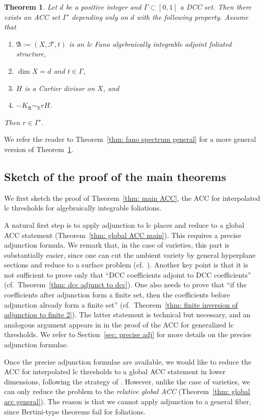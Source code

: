 \documentclass[11pt,reqno]{amsart}
\numberwithin{equation}{section}
\newcommand{\Aa}{{\mathfrak{A}}}
\newcommand{\Ff}{\mathcal{F}}
\newcommand{\Ii}{\Gamma}
\newtheorem{thm}{Theorem}[section]
\theoremstyle{definition}
\begin{document}
\begin{thm}\label{thm: fano spectrum main}
    Let $d$ be a positive integer and $\Ii\subset [0,1]$ a DCC set. Then there exists an ACC set $\Ii'$ depending only on $d$ with the following property. Assume that
\begin{enumerate}
    \item $\Aa:=(X,\Ff,t)$ is an lc Fano algebraically integrable adjoint foliated structure,
    \item $\dim X=d$ and $t\in\Ii$,
    \item $H$ is a Cartier divisor on $X$, and
    \item $-K_{\Aa}\sim_{\mathbb R}rH$.
\end{enumerate}
Then $r\in\Ii'$.
\end{thm}

We refer the reader to Theorem~\ref{thm: fano spectrum general} for a more general version of Theorem~\ref{thm: fano spectrum main}.


\subsection*{Sketch of the proof of the main theorems} We first sketch the proof of Theorem~\ref{thm: main ACC}, the ACC for interpolated lc thresholds for algebraically integrable foliations. 

A natural first step is to apply adjunction to lc places and reduce to a global ACC statement (Theorem~\ref{thm: global ACC main}). This requires a precise adjunction formula. We remark that, in the case of varieties, this part is substantially easier, since one can cut the ambient variety by general hyperplane sections and reduce to a surface problem (cf.~\cite[Section~16]{Kol+92}). Another key point is that it is not sufficient to prove only that ``DCC coefficients adjoint to DCC coefficients'' (cf.~Theorem~\ref{thm: dcc adjunct to dcc}). One also needs to prove that ``if the coefficients after adjunction form a finite set, then the coefficients before adjunction already form a finite set'' (cf.~Theorem~\ref{thm: finite inversion of adjunction to finite 2}). The latter statement is technical but necessary, and an analogous argument appears in \cite[Lemma~4.10]{BZ16} in the proof of the ACC for generalized lc thresholds. We refer to Section~\ref{sec: precise adj} for more details on the precise adjunction formulae.

Once the precise adjunction formulae are available, we would like to reduce the ACC for interpolated lc thresholds to a global ACC statement in lower dimensions, following the strategy of \cite[Section~5]{HMX14}. However, unlike the case of varieties, we can only reduce the problem to the \emph{relative global ACC} (Theorem~\ref{thm: global acc general}). The reason is that we cannot apply adjunction to a general fiber, since Bertini-type theorems fail for foliations. 
\end{document}
